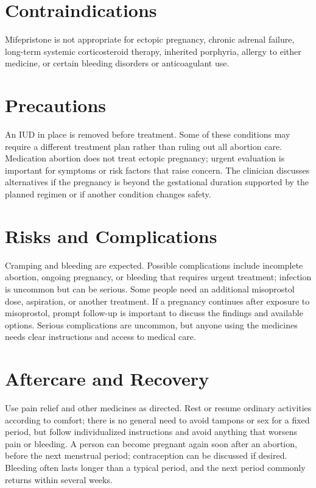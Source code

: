 \section*{Contraindications}
Mifepristone is not appropriate for ectopic pregnancy, chronic adrenal failure, long-term systemic corticosteroid therapy, inherited porphyria, allergy to either medicine, or certain bleeding disorders or anticoagulant use.

\section*{Precautions}
An IUD in place is removed before treatment. Some of these conditions may require a different treatment plan rather than ruling out all abortion care. Medication abortion does not treat ectopic pregnancy; urgent evaluation is important for symptoms or risk factors that raise concern. The clinician discusses alternatives if the pregnancy is beyond the gestational duration supported by the planned regimen or if another condition changes safety.

\section*{Risks and Complications}
Cramping and bleeding are expected. Possible complications include incomplete abortion, ongoing pregnancy, or bleeding that requires urgent treatment; infection is uncommon but can be serious. Some people need an additional misoprostol dose, aspiration, or another treatment. If a pregnancy continues after exposure to misoprostol, prompt follow-up is important to discuss the findings and available options. Serious complications are uncommon, but anyone using the medicines needs clear instructions and access to medical care.

\section*{Aftercare and Recovery}
Use pain relief and other medicines as directed. Rest or resume ordinary activities according to comfort; there is no general need to avoid tampons or sex for a fixed period, but follow individualized instructions and avoid anything that worsens pain or bleeding. A person can become pregnant again soon after an abortion, before the next menstrual period; contraception can be discussed if desired. Bleeding often lasts longer than a typical period, and the next period commonly returns within several weeks.

